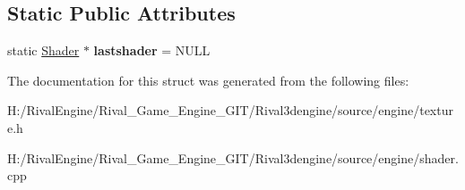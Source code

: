\subsection*{Static Public Attributes}
\begin{DoxyCompactItemize}
\item 
\mbox{\label{struct_shader_a8a1e74e8c28426e1f4d8c60496c2a7a2}} 
static \hyperlink{struct_shader}{Shader} $\ast$ {\bfseries lastshader} = N\+U\+LL
\end{DoxyCompactItemize}


The documentation for this struct was generated from the following files\+:\begin{DoxyCompactItemize}
\item 
H\+:/\+Rival\+Engine/\+Rival\+\_\+\+Game\+\_\+\+Engine\+\_\+\+G\+I\+T/\+Rival3dengine/source/engine/texture.\+h\item 
H\+:/\+Rival\+Engine/\+Rival\+\_\+\+Game\+\_\+\+Engine\+\_\+\+G\+I\+T/\+Rival3dengine/source/engine/shader.\+cpp\end{DoxyCompactItemize}
